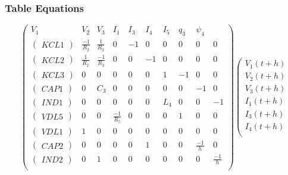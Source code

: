 \subsubsection{Table Equations}
\[\left(\begin{array}{ccccccccccc}
  V_{1}&V_{2}&V_{3}&I_{1}&I_{3}&I_{4}&I_{5}&q_{3}&\psi _{4}\\
  \hline
  \left(\begin{array}{c} KCL1 \end{array}\right)&\frac{-1}{R_{2}}&\frac{1}{R_{2}}&0&-1&0&0&0&0&0\\
  \left(\begin{array}{c} KCL2 \end{array}\right)&\frac{1}{R_{2}}&\frac{-1}{R_{2}}&0&0&-1&0&0&0&0\\
  \left(\begin{array}{c} KCL3 \end{array}\right)&0&0&0&0&0&1&-1&0&0\\
  \left(\begin{array}{c} CAP1 \end{array}\right)&0&C_{3}&0&0&0&0&0&-1&0\\
  \left(\begin{array}{c} IND1 \end{array}\right)&0&0&0&0&0&L_{4}&0&0&-1\\
  \left(\begin{array}{c} VDL5 \end{array}\right)&0&0&\frac{-1}{R_{5}}&0&0&0&1&0&0\\
  \left(\begin{array}{c} VDL1 \end{array}\right)&1&0&0&0&0&0&0&0&0\\
  \left(\begin{array}{c} CAP2 \end{array}\right)&0&0&0&0&1&0&0&\frac{-1}{h}&0\\
  \left(\begin{array}{c} IND2 \end{array}\right)&0&1&0&0&0&0&0&0&\frac{-1}{h}\\
\end{array}\right) \left(\begin{array}{c}
 V_{1}(t+h)\\
 V_{2}(t+h)\\
 V_{3}(t+h)\\
 I_{1}(t+h)\\
 I_{3}(t+h)\\
 I_{4}(t+h)\\

\end{array}\]
